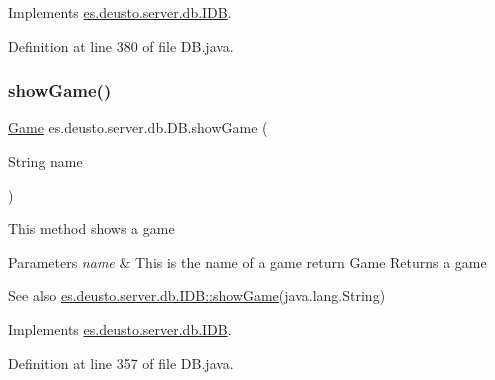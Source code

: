 Implements \hyperlink{interfacees_1_1deusto_1_1server_1_1db_1_1_i_d_b_a1681e29b5fbe4377b19e67fa939b2782}{es.\+deusto.\+server.\+db.\+I\+DB}.



Definition at line 380 of file D\+B.\+java.

\mbox{\label{classes_1_1deusto_1_1server_1_1db_1_1_d_b_adba76c20f2fc7ed01d486564d881a718}} 
\subsubsection{\texorpdfstring{show\+Game()}{showGame()}}
{\footnotesize\ttfamily \hyperlink{classes_1_1deusto_1_1server_1_1db_1_1data_1_1_game}{Game} es.\+deusto.\+server.\+db.\+D\+B.\+show\+Game (\begin{DoxyParamCaption}\item[{String}]{name }\end{DoxyParamCaption})}

This method shows a game 
\begin{DoxyParams}{Parameters}
{\em name} & This is the name of a game return Game Returns a game \\
\hline
\end{DoxyParams}
\begin{DoxySeeAlso}{See also}
\hyperlink{interfacees_1_1deusto_1_1server_1_1db_1_1_i_d_b_a572028cc62d36bebee977200b55eba8b}{es.\+deusto.\+server.\+db.\+I\+D\+B\+::show\+Game}(java.\+lang.\+String) 
\end{DoxySeeAlso}


Implements \hyperlink{interfacees_1_1deusto_1_1server_1_1db_1_1_i_d_b_a572028cc62d36bebee977200b55eba8b}{es.\+deusto.\+server.\+db.\+I\+DB}.



Definition at line 357 of file D\+B.\+java.

\mbox{\label{classes_1_1deusto_1_1server_1_1db_1_1_d_b_a207ddeb183db925dc20f095033aa4d94}} 
